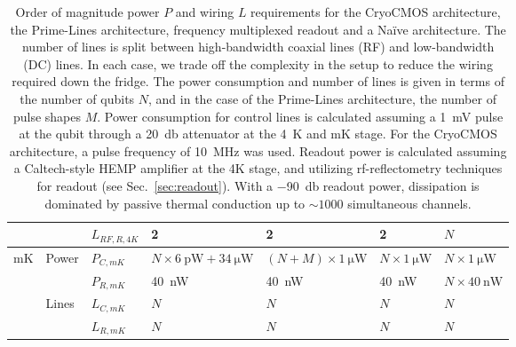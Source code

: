 {\begin{landscape}
\begin{table}
\begin{tabular}{lllllll}
                        &                        & $L_{RF,R,4K}$ & 2                         & 2                        & 2   & $N$                 \\\hline
    \multirow{4}{*}{mK} & \multirow{2}{*}{Power} & $P_{C,mK}$ & $N\times\SI{6}{\pico\watt} + \SI{34}{\micro\watt}$ & $ (N+M)\times\SI{1}{\micro\watt}$ & $N\times\SI{1}{\micro\watt}$   & $N\times\SI{1}{\micro\watt}$                   \\
                        &                        & $P_{R,mK}$ & \SI{40}{\nano\watt}     & \SI{40}{\nano\watt}           &\SI{40}{\nano\watt}   & $N\times\SI{40}{\nano\watt}$ \\\cline{2-7}
                        & \multirow{2}{*}{Lines} & $L_{C,mK}$ & $N$                     & $N$                           & $N$ & $N$                 \\
                        &                        & $L_{R,mK}$ & $N$                     & $N$                           & $N$ & $N$                 \\
    \bottomrule
    \end{tabular}
    \caption[Approximate power and wiring requirements for a QC]{Order of magnitude power $P$ and wiring $L$ requirements for the CryoCMOS architecture, the Prime-Lines architecture, frequency multiplexed readout and a Na\"ive architecture. The number of lines is split between high-bandwidth coaxial lines (RF) and low-bandwidth (DC) lines. In each case, we trade off the complexity in the setup to reduce the wiring required down the fridge. The power consumption and number of lines is given in terms of the number of qubits $N$, and in the case of the Prime-Lines architecture, the number of pulse shapes $M$. Power consumption for control lines is calculated assuming a \SI{1}{\milli\volt} pulse at the qubit through a \SI{20}{\decibel} attenuator at the \SI{4}{\kelvin} and mK stage. For the CryoCMOS architecture, a pulse frequency of \SI{10}{\mega\hertz} was used. Readout power is calculated assuming a Caltech-style HEMP amplifier at the 4K stage, and utilizing rf-reflectometry techniques for readout (see Sec.~\ref{sec:readout}). With a \SI{-90}{\decibel} readout power,
    dissipation is dominated by passive thermal conduction up to $\sim 1000$ simultaneous channels.}
    \label{tab:arch}
  \end{table}
\end{landscape}
}

